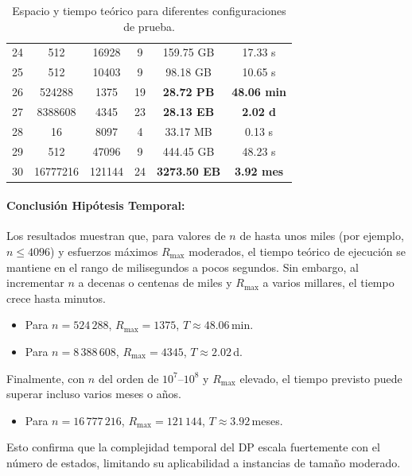 \documentclass[11pt,letter]{article}
\begin{document}
\begin{table}[H]
\begin{tabular}{|c|c|c|c|c|c|}
    24 & 512 & 16928 & 9 & 159.75 GB & 17.33 s \\
    25 & 512 & 10403 & 9 & 98.18 GB & 10.65 s \\
    26 & 524288 & 1375 & 19 & \cellcolor{yellow}\textbf{28.72 PB} & \cellcolor{yellow}\textbf{48.06 min} \\
    27 & 8388608 & 4345 & 23 & \cellcolor{yellow}\textbf{28.13 EB} & \cellcolor{yellow}\textbf{2.02 d} \\
    28 & 16 & 8097 & 4 & 33.17 MB & 0.13 s \\
    29 & 512 & 47096 & 9 & 444.45 GB & 48.23 s \\
    30 & 16777216 & 121144 & 24 & \cellcolor{yellow}\textbf{3273.50 EB} & \cellcolor{yellow}\textbf{3.92 mes} \\
    \hline
    \end{tabular}
    \caption{Espacio y tiempo teórico para diferentes configuraciones de prueba.}
    \end{table}




       \paragraph{Conclusión Hipótesis Temporal:}
    Los resultados muestran que, para valores de \(n\) de hasta unos miles (por ejemplo, \(n \le 4096\)) y esfuerzos máximos \(R_{\max}\) moderados, el tiempo teórico de ejecución se mantiene en el rango de milisegundos a pocos segundos. Sin embargo, al incrementar \(n\) a decenas o centenas de miles y \(R_{\max}\) a varios millares, el tiempo crece hasta minutos.

    \begin{itemize}
      \item Para \(n=524\,288\), \(R_{\max}=1375\), \(T\approx48.06\)\,min.
      \item Para \(n=8\,388\,608\), \(R_{\max}=4345\), \(T\approx2.02\)\,d.
    \end{itemize}

    Finalmente, con \(n\) del orden de \(10^7\)–\(10^8\) y \(R_{\max}\) elevado, el tiempo previsto puede superar incluso varios meses o años.

    \begin{itemize}
      \item Para \(n=16\,777\,216\), \(R_{\max}=121\,144\), \(T\approx3.92\)\,meses.
    \end{itemize}

    Esto confirma que la complejidad temporal del DP escala fuertemente con el número de estados, limitando su aplicabilidad a instancias de tamaño moderado.
\end{document}
